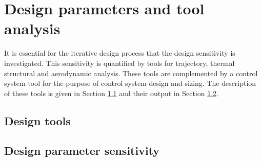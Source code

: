 \section{Design parameters and tool analysis}\label{cha:designpar}
It is essential for the iterative design process that the design sensitivity is investigated. This sensitivity is quantified by tools for trajectory, thermal structural and aerodynamic analysis. These tools are complemented by a control system tool for the purpose of control system design and sizing. The description of these tools is given in Section \ref{sec:designtools} and their output in Section \ref{sec:designsens}.

\subsection{Design tools} \label{sec:designtools}


\subsection{Design parameter sensitivity} \label{sec:designsens}

